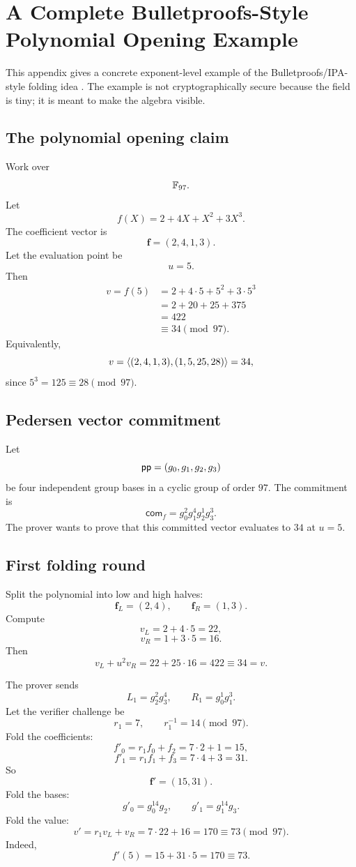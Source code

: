 \section{A Complete Bulletproofs-Style Polynomial Opening Example}
\label{app:bulletproofs-example}

This appendix gives a concrete exponent-level example of the Bulletproofs/IPA-style folding idea \cite{Bulletproofs2018}. The example is not cryptographically secure because the field is tiny; it is meant to make the algebra visible.

\subsection{The polynomial opening claim}

Work over
\[
    \mathbb{F}_{97}.
\]
Let
\[
    f(X)=2+4X+X^2+3X^3.
\]
The coefficient vector is
\[
    \mathbf f=(2,4,1,3).
\]
Let the evaluation point be
\[
    u=5.
\]
Then
\[
\begin{aligned}
    v=f(5)
    &=2+4\cdot 5+5^2+3\cdot 5^3\\
    &=2+20+25+375\\
    &=422\\
    &\equiv 34\pmod{97}.
\end{aligned}
\]
Equivalently,
\[
    v=\left\langle (2,4,1,3),(1,5,25,28)\right\rangle=34,
\]
since $5^3=125\equiv 28\pmod{97}$.

\subsection{Pedersen vector commitment}

Let
\[
    \mathsf{pp}=(g_0,g_1,g_2,g_3)
\]
be four independent group bases in a cyclic group of order $97$. The commitment is
\[
    \mathsf{com}_f=g_0^2g_1^4g_2^1g_3^3.
\]
The prover wants to prove that this committed vector evaluates to $34$ at $u=5$.

\subsection{First folding round}

Split the polynomial into low and high halves:
\[
    \mathbf f_L=(2,4),
    \qquad
    \mathbf f_R=(1,3).
\]
Compute
\[
    v_L=2+4\cdot 5=22,
\]
\[
    v_R=1+3\cdot 5=16.
\]
Then
\[
    v_L+u^2v_R=22+25\cdot 16=422\equiv 34=v.
\]

The prover sends
\[
    L_1=g_2^2g_3^4,
    \qquad
    R_1=g_0^1g_1^3.
\]
Let the verifier challenge be
\[
    r_1=7,
    \qquad
    r_1^{-1}=14\pmod{97}.
\]
Fold the coefficients:
\[
    f'_0=r_1f_0+f_2=7\cdot 2+1=15,
\]
\[
    f'_1=r_1f_1+f_3=7\cdot 4+3=31.
\]
So
\[
    \mathbf f'=(15,31).
\]
Fold the bases:
\[
    g'_0=g_0^{14}g_2,
    \qquad
    g'_1=g_1^{14}g_3.
\]
Fold the value:
\[
    v'=r_1v_L+v_R=7\cdot22+16=170\equiv 73\pmod{97}.
\]
Indeed,
\[
    f'(5)=15+31\cdot5=170\equiv 73.
\]

